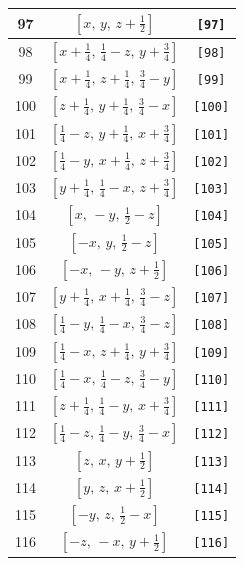 \documentclass[fleqn,8pt]{jsarticle}
\begin{document}
\begin{longtable}{ccc}
97 & $\left[ x,\, y,\, z + \frac{1}{2} \right]$ & {\tt [97]} \\ \hline
98 & $\left[ x + \frac{1}{4},\, \frac{1}{4} - z,\, y + \frac{3}{4} \right]$ & {\tt [98]} \\ \hline
99 & $\left[ x + \frac{1}{4},\, z + \frac{1}{4},\, \frac{3}{4} - y \right]$ & {\tt [99]} \\ \hline
100 & $\left[ z + \frac{1}{4},\, y + \frac{1}{4},\, \frac{3}{4} - x \right]$ & {\tt [100]} \\ \hline
101 & $\left[ \frac{1}{4} - z,\, y + \frac{1}{4},\, x + \frac{3}{4} \right]$ & {\tt [101]} \\ \hline
102 & $\left[ \frac{1}{4} - y,\, x + \frac{1}{4},\, z + \frac{3}{4} \right]$ & {\tt [102]} \\ \hline
103 & $\left[ y + \frac{1}{4},\, \frac{1}{4} - x,\, z + \frac{3}{4} \right]$ & {\tt [103]} \\ \hline
104 & $\left[ x,\, - y,\, \frac{1}{2} - z \right]$ & {\tt [104]} \\ \hline
105 & $\left[ - x,\, y,\, \frac{1}{2} - z \right]$ & {\tt [105]} \\ \hline
106 & $\left[ - x,\, - y,\, z + \frac{1}{2} \right]$ & {\tt [106]} \\ \hline
107 & $\left[ y + \frac{1}{4},\, x + \frac{1}{4},\, \frac{3}{4} - z \right]$ & {\tt [107]} \\ \hline
108 & $\left[ \frac{1}{4} - y,\, \frac{1}{4} - x,\, \frac{3}{4} - z \right]$ & {\tt [108]} \\ \hline
109 & $\left[ \frac{1}{4} - x,\, z + \frac{1}{4},\, y + \frac{3}{4} \right]$ & {\tt [109]} \\ \hline
110 & $\left[ \frac{1}{4} - x,\, \frac{1}{4} - z,\, \frac{3}{4} - y \right]$ & {\tt [110]} \\ \hline
111 & $\left[ z + \frac{1}{4},\, \frac{1}{4} - y,\, x + \frac{3}{4} \right]$ & {\tt [111]} \\ \hline
112 & $\left[ \frac{1}{4} - z,\, \frac{1}{4} - y,\, \frac{3}{4} - x \right]$ & {\tt [112]} \\ \hline
113 & $\left[ z,\, x,\, y + \frac{1}{2} \right]$ & {\tt [113]} \\ \hline
114 & $\left[ y,\, z,\, x + \frac{1}{2} \right]$ & {\tt [114]} \\ \hline
115 & $\left[ - y,\, z,\, \frac{1}{2} - x \right]$ & {\tt [115]} \\ \hline
116 & $\left[ - z,\, - x,\, y + \frac{1}{2} \right]$ & {\tt [116]} \\ \hline

\end{longtable}
\end{document}
